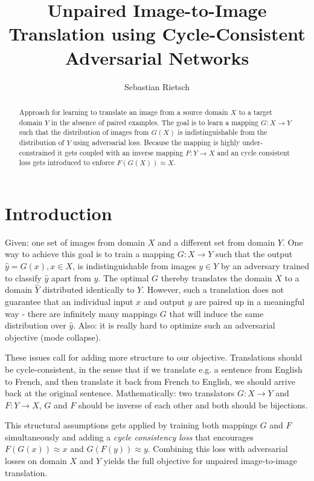 \documentclass{scrartcl}
\begin{document}
\title{Unpaired Image-to-Image Translation
using Cycle-Consistent Adversarial Networks}
\author{Sebastian Rietsch}

\maketitle
\begin{abstract}
Approach for learning to translate an image from a source domain $X$ to a target domain $Y$ in the absence of paired examples. The goal is to learn a mapping $G: X \rightarrow Y$ such that the distribution of images from $G(X)$ is indistinguishable from the distribution of $Y$ using adversarial loss. Because the mapping is highly under-constrained it gets coupled with an inverse mapping $F: Y \rightarrow X$ and an cycle consistent loss gets introduced to enforce $F(G(X)) \approx X$.
\end{abstract}

\section*{Introduction}
Given: one set of images from domain $X$ and a different set from domain $Y$. One way to achieve this goal is to train a mapping $G: X \rightarrow Y$ such that the output $\hat{y} = G(x), x \in X$, is indistinguishable from images $y \in Y$ by an adversary trained to classify $\hat{y}$ apart from $y$. The optimal $G$ thereby translates the domain $X$ to a domain $\hat{Y}$ distributed identically to $Y$. However, such a translation does not guarantee that an individual input $x$ and output $y$ are paired up in a meaningful way - there are infinitely many mappings $G$ that will induce the same distribution over $\hat{y}$. Also: it is really hard to optimize such an adversarial objective (mode collapse).

These issues call for adding more structure to our objective. Translations should be cycle-consistent, in the sense that if we translate e.g. a sentence from English to French, and then translate it back from French to English, we should arrive back at the original sentence. Mathematically: two translators $G: X \rightarrow Y$ and $F: Y \rightarrow X$, $G$ and $F$ should be inverse of each other and both should be bijections.

This structural assumptions gets applied by training both mappings $G$ and $F$ simultaneously and adding a \textit{cycle consistency loss} that encourages $F(G(x)) \approx x$ and $G(F(y)) \approx y$. Combining this loss with adversarial losses on domain $X$ and $Y$ yields the full objective for unpaired image-to-image translation.
\end{document}
